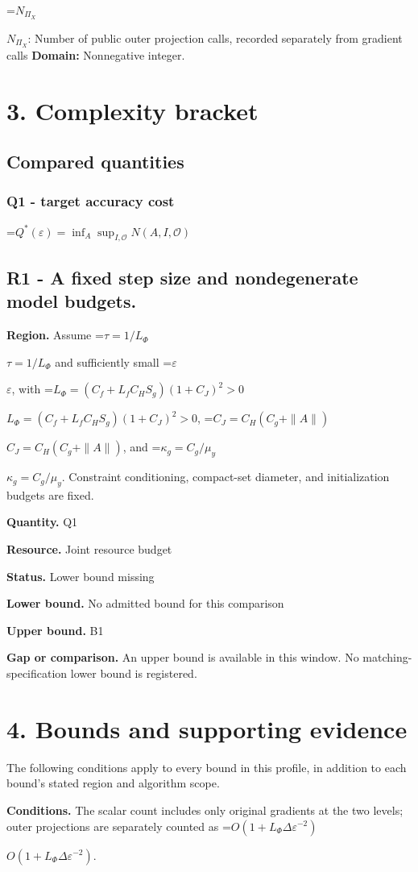 \documentclass[10pt,a4paper]{article}
\newcommand{\AtlasMath}[1]{\par\begingroup\centering\setbox0=\hbox{$\displaystyle #1$}\ifdim\wd0>1.4\linewidth\typeout{ATLAS WIDE FORMULA: \the\wd0}\fi\ifdim\wd0>\linewidth\resizebox{\linewidth}{!}{\box0}\else\box0\fi\par\endgroup}
\newcommand{\AtlasInlineMath}[1]{\begingroup\setbox0=\hbox{$#1$}\ifdim\wd0>.4\linewidth\endgroup\AtlasMath{#1}\else\endgroup$#1$\fi}
\begin{document}
\AtlasInlineMath{N_{\Pi_X}}: Number of public outer projection calls, recorded separately from gradient calls \textbf{Domain:} Nonnegative integer.

\section{3. Complexity bracket}
\subsection{Compared quantities}
\subsubsection{Q1 - target accuracy cost}
\AtlasMath{Q^*(\varepsilon)=\inf_A\sup_{I,\mathcal O}N(A,I,\mathcal O)}
\subsection{R1 - A fixed step size and nondegenerate model budgets.}
\textbf{Region.} Assume \AtlasInlineMath{\tau=1/L_\Phi} and sufficiently small \AtlasInlineMath{\varepsilon}, with \AtlasInlineMath{L_\Phi=(C_f+L_fC_HS_g)(1+C_J)^2>0}, \AtlasInlineMath{C_J=C_H(C_g+\|A\|)}, and \AtlasInlineMath{\kappa_g=C_g/\mu_y}. Constraint conditioning, compact-set diameter, and initialization budgets are fixed.

\textbf{Quantity.} Q1

\textbf{Resource.} Joint resource budget

\textbf{Status.} Lower bound missing

\textbf{Lower bound.} No admitted bound for this comparison

\textbf{Upper bound.} B1

\textbf{Gap or comparison.} An upper bound is available in this window. No matching-specification lower bound is registered.

\section{4. Bounds and supporting evidence}
The following conditions apply to every bound in this profile, in addition to each bound's stated region and algorithm scope.

\textbf{Conditions.} The scalar count includes only original gradients at the two levels; outer projections are separately counted as \AtlasInlineMath{O(1+L_\Phi\Delta\varepsilon^{-2})}.
\end{document}
